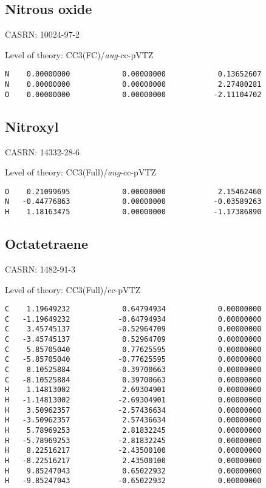 \documentclass[journal=jctcce,manuscript=article,layout=traditional]{achemso}
\newcommand{\TZ}{cc-pVTZ}
\newcommand{\AVTZ}{\emph{aug}-cc-pVTZ}
\begin{document}
\subsection{Nitrous oxide}

CASRN: 10024-97-2

\begin{singlespace}
\noindent   Level of theory: CC3(FC)/{\AVTZ}
\begin{verbatim}
N    0.00000000            0.00000000            0.13652607
N    0.00000000            0.00000000            2.27480281
O    0.00000000            0.00000000           -2.11104702
\end{verbatim}
\end{singlespace}

\subsection{Nitroxyl}

CASRN: 14332-28-6

\begin{singlespace}
\noindent   Level of theory: CC3(Full)/{\AVTZ}
\begin{verbatim}
O    0.21099695            0.00000000            2.15462460
N   -0.44776863            0.00000000           -0.03589263
H    1.18163475            0.00000000           -1.17386890
\end{verbatim}
\end{singlespace}

\subsection{Octatetraene}

CASRN: 1482-91-3

\begin{singlespace}
\noindent  Level of theory: CC3(Full)/{\TZ}
\begin{verbatim}
C    1.19649232            0.64794934            0.00000000
C   -1.19649232           -0.64794934            0.00000000
C    3.45745137           -0.52964709            0.00000000
C   -3.45745137            0.52964709            0.00000000
C    5.85705040            0.77625595            0.00000000
C   -5.85705040           -0.77625595            0.00000000
C    8.10525884           -0.39700663            0.00000000
C   -8.10525884            0.39700663            0.00000000
H    1.14813002            2.69304901            0.00000000
H   -1.14813002           -2.69304901            0.00000000
H    3.50962357           -2.57436634            0.00000000
H   -3.50962357            2.57436634            0.00000000
H    5.78969253            2.81832245            0.00000000
H   -5.78969253           -2.81832245            0.00000000
H    8.22516217           -2.43500100            0.00000000
H   -8.22516217            2.43500100            0.00000000
H    9.85247043            0.65022932            0.00000000
H   -9.85247043           -0.65022932            0.00000000
\end{verbatim}
\end{singlespace}
\end{document}
